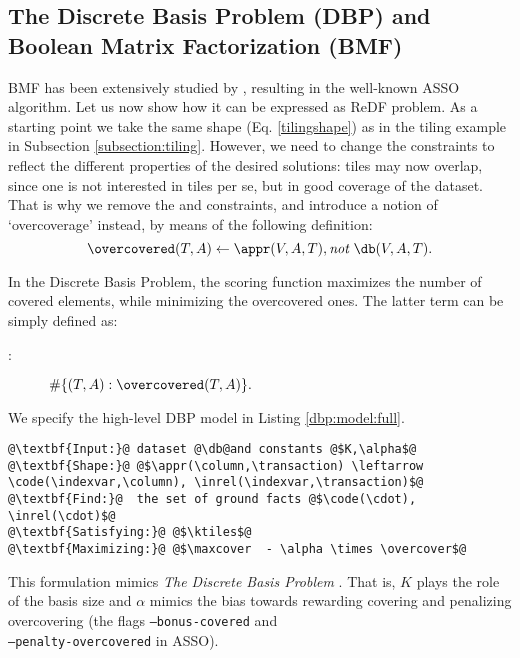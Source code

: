 \subsection{The Discrete Basis Problem (DBP) and Boolean Matrix Factorization (BMF)}
\label{subsection:bmf}
BMF has been extensively studied by \cite{conf/icdm/Miettinen12}, resulting in the well-known ASSO algorithm. Let us now show how it can be expressed as ReDF problem. As a starting point we take the same shape (Eq. \ref{tilingshape}) as in the tiling example in Subsection \ref{subsection:tiling}. However, we need to change the constraints to reflect the different properties of the desired solutions: tiles may now overlap, since one is not interested in tiles per se, but in good coverage of the dataset. That is why we remove 
the \intersectionConstraint and \overcoverageConstraint constraints, and introduce a notion of `overcoverage' instead, by means of the following definition:
\begin{equation*}
\overcovered(T,A) \leftarrow  \appr(V,A,T), \textit{not}~ \db(V,A,T). %
\end{equation*}

In the Discrete Basis Problem, the scoring function maximizes the number of covered elements, while minimizing the overcovered ones. The latter term can be simply defined as: 
\begin{description}
\item[\overcoverage:] $\#\{ (T,A) : \overcovered(T,A) \}. $
\end{description}
We specify the high-level DBP model in Listing \ref{dbp:model:full}.
\begin{lstlisting}[style=model, caption=ReDF Model for the Discrete Basis Problem, label=dbp:model:full]
@\textbf{Input:}@ dataset @\db@and constants @$K,\alpha$@
@\textbf{Shape:}@ @$\appr(\column,\transaction) \leftarrow \code(\indexvar,\column), \inrel(\indexvar,\transaction)$@
@\textbf{Find:}@  the set of ground facts @$\code(\cdot), \inrel(\cdot)$@
@\textbf{Satisfying:}@ @$\ktiles$@
@\textbf{Maximizing:}@ @$\maxcover  - \alpha \times \overcover$@
\end{lstlisting}
This formulation mimics \textit{The Discrete Basis Problem} \parencite{dbp}. That is, $K$ plays the role of the basis size and $\alpha$ mimics the bias towards rewarding covering and penalizing overcovering (the flags \texttt{--bonus-covered} and\\\texttt{--penalty-overcovered} in ASSO).

